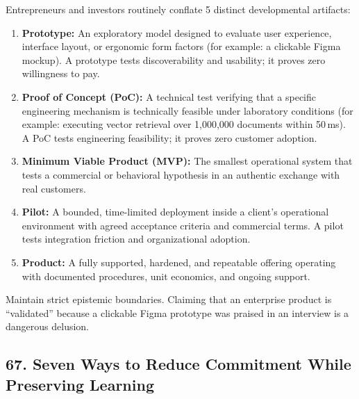 Entrepreneurs and investors routinely conflate 5 distinct developmental artifacts:
\begin{enumerate}
    \item \textbf{Prototype:} An exploratory model designed to evaluate user experience, interface layout, or ergonomic form factors (for example: a clickable Figma mockup). A prototype tests discoverability and usability; it proves zero willingness to pay.
    \item \textbf{Proof of Concept (PoC):} A technical test verifying that a specific engineering mechanism is technically feasible under laboratory conditions (for example: executing vector retrieval over 1,000,000 documents within 50\,ms). A PoC tests engineering feasibility; it proves zero customer adoption.
    \item \textbf{Minimum Viable Product (MVP):} The smallest operational system that tests a commercial or behavioral hypothesis in an authentic exchange with real customers.
    \item \textbf{Pilot:} A bounded, time-limited deployment inside a client's operational environment with agreed acceptance criteria and commercial terms. A pilot tests integration friction and organizational adoption.
    \item \textbf{Product:} A fully supported, hardened, and repeatable offering operating with documented procedures, unit economics, and ongoing support.
\end{enumerate}

Maintain strict epistemic boundaries. Claiming that an enterprise product is ``validated'' because a clickable Figma prototype was praised in an interview is a dangerous delusion.

\subsection*{67. Seven Ways to Reduce Commitment While Preserving Learning}

